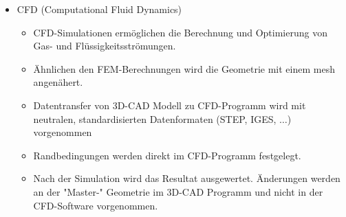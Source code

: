 \documentclass[10pt,a4paper,fleqn]{article}
\begin{document}
\begin{enumerate}
\begin{itemize}
				\item CFD (Computational Fluid Dynamics)
					\begin{itemize}
						\item CFD-Simulationen ermöglichen die Berechnung und Optimierung von Gas- und Flüssigkeitsströmungen.
						\item Ähnlichen den FEM-Berechnungen wird die Geometrie mit einem mesh angenähert.
						\item Datentransfer von 3D-CAD Modell zu CFD-Programm wird mit neutralen, standardisierten Datenformaten (STEP, IGES, $\dots$) vorgenommen
						\item Randbedingungen werden direkt im CFD-Programm festgelegt.
						\item Nach der Simulation wird das Resultat ausgewertet. Änderungen werden an der "Master-" Geometrie im 3D-CAD Programm und nicht in der CFD-Software vorgenommen.
					\end{itemize}


\end{itemize}
\end{enumerate}
\end{document}
